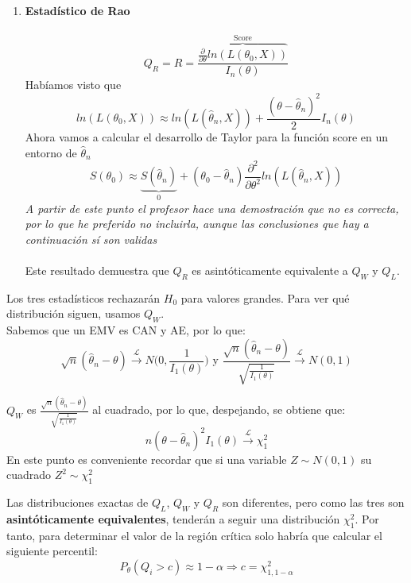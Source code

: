 \begin{enumerate}
    \item \textbf{Estadístico de Rao}\\\ \\
    $$Q_R=R=\frac{\overbrace{\frac{\partial}{\partial\theta}ln(L(\theta_0,X))}^{\text{Score}}}{I_n(\theta)}$$
    Habíamos visto que 
    $$ln(L(\theta_0,X))\approx ln(L(\hat\theta_n,X))+\frac{(\theta-\hat\theta_n)^2}{2}I_n(\theta)$$
    Ahora vamos a calcular el desarrollo de Taylor para la función score en un entorno de $\hat\theta_n$
    $$S(\theta_0)\approx \underbrace{S(\hat\theta_n)}_{0}+(\theta_0-\hat\theta_n)\frac{\partial^2}{\partial\theta^2}ln(L(\hat\theta_n,X))$$
    \textit{A partir de este punto el profesor hace una demostración que no es correcta, por lo que he preferido no incluirla, aunque las conclusiones que hay a continuación sí son validas}\\\ \\
    Este resultado demuestra que $Q_R$ es asintóticamente equivalente a $Q_W$ y $Q_L$. 
\end{enumerate}

Los tres estadísticos rechazarán $H_0$ para valores grandes. Para ver qué distribución siguen, usamos $Q_W$.\\
Sabemos que un EMV es CAN y AE, por lo que:
$$\sqrt{n}(\hat\theta_n-\theta)\overset{\mathcal{L}}{\longrightarrow}N\Big(0,\frac{1}{I_1(\theta)}\Big)\text{ y }\frac{\sqrt{n}(\hat\theta_n-\theta)}{\sqrt{\frac{1}{I_1(\theta)}}}\overset{\mathcal{L}}{\longrightarrow}N(0,1)$$

$Q_W$ es $\displaystyle\frac{\sqrt{n}(\hat\theta_n-\theta)}{\sqrt{\frac{1}{I_1(\theta)}}}$ al cuadrado, por lo que, despejando, se obtiene que:
$$n(\theta-\hat\theta_n)^2I_1(\theta)\overset{\mathcal{L}}{\longrightarrow}\chi^2_1$$
En este punto es conveniente recordar que si una variable $Z\sim N(0,1)$ su cuadrado $Z^2\sim \chi^2_1$

Las distribuciones exactas de $Q_L$, $Q_W$ y $Q_R$ son diferentes, pero como las tres son \textbf{asintóticamente equivalentes}, tenderán a seguir una distribución $\chi^2_1$. 
Por tanto, para determinar el valor de la región crítica solo habría que calcular el siguiente percentil:
$$P_{\theta}(Q_i>c)\approx 1-\alpha\Longrightarrow  c=\chi^2_{1,1-\alpha}$$











